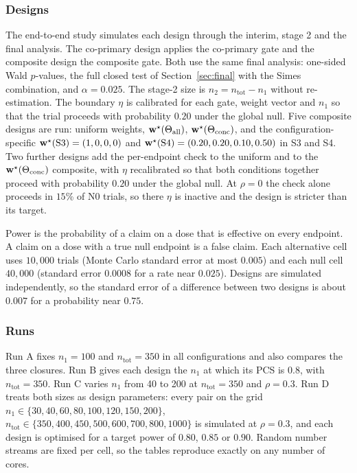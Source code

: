 \subsubsection{Designs}
The end-to-end study simulates each design through the interim, stage 2 and the final analysis. The co-primary design applies the co-primary gate and the composite design the composite gate. Both use the same final analysis: one-sided Wald $p$-values, the full closed test of Section~\ref{sec:final} with the Simes combination, and $\alpha=0.025$. The stage-2 size is $n_2=n_{\mathrm{tot}}-n_1$ without re-estimation. The boundary $\eta$ is calibrated for each gate, weight vector and $n_1$ so that the trial proceeds with probability $0.20$ under the global null. Five composite designs are run: uniform weights, $\mathbf{w}^\star(\Theta_{\mathrm{all}})$, $\mathbf{w}^\star(\Theta_{\mathrm{conc}})$, and the configuration-specific $\mathbf{w}^\star(\mathrm{S3})=(1,0,0,0)$ and $\mathbf{w}^\star(\mathrm{S4})=(0.20,0.20,0.10,0.50)$ in S3 and S4. Two further designs add the per-endpoint check to the uniform and to the $\mathbf{w}^\star(\Theta_{\mathrm{conc}})$ composite, with $\eta$ recalibrated so that both conditions together proceed with probability $0.20$ under the global null. At $\rho=0$ the check alone proceeds in $15$\% of N0 trials, so there $\eta$ is inactive and the design is stricter than its target.

Power is the probability of a claim on a dose that is effective on every endpoint. A claim on a dose with a true null endpoint is a false claim. Each alternative cell uses $10{,}000$ trials (Monte Carlo standard error at most $0.005$) and each null cell $40{,}000$ (standard error $0.0008$ for a rate near $0.025$). Designs are simulated independently, so the standard error of a difference between two designs is about $0.007$ for a probability near $0.75$.

\subsubsection{Runs}
Run A fixes $n_1=100$ and $n_{\mathrm{tot}}=350$ in all configurations and also compares the three closures. Run B gives each design the $n_1$ at which its PCS is $0.8$, with $n_{\mathrm{tot}}=350$. Run C varies $n_1$ from 40 to 200 at $n_{\mathrm{tot}}=350$ and $\rho=0.3$. Run D treats both sizes as design parameters: every pair on the grid $n_1\in\{30,40,60,80,100,120,150,200\}$, $n_{\mathrm{tot}}\in\{350,400,450,500,600,700,800,1000\}$ is simulated at $\rho=0.3$, and each design is optimised for a target power of $0.80$, $0.85$ or $0.90$. Random number streams are fixed per cell, so the tables reproduce exactly on any number of cores.

